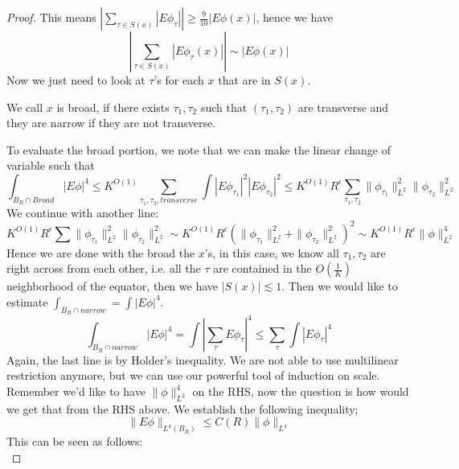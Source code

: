 \begin{proof}
    This means $\left|\sum_{\tau\in S(x)}|E\phi_\tau| \right|\geq\frac{9}{10}|E\phi(x)|$, hence we have
    \begin{equation*}
        \left|\sum_{\tau\in S(x)}|E\phi_\tau(x)| \right|\sim|E\phi(x)|
    \end{equation*}
Now we just need to look at $\tau$'s for each $x$ that are in $S(x)$. 
\begin{definition}
    We call $x$ is broad, if there exists $\tau_1, \tau_2$ such that $(\tau_1, \tau_2)$ are transverse and they are narrow if they are not transverse.    
\end{definition}
    To evaluate the broad portion, we note that we can make the linear change of variable such that 
    \begin{equation*}
        \int_{{B_R}\cap Broad}|E\phi|^4\leq K^{O(1)}\sum_{\tau_1, \tau_2, transverse}\int|E\phi_{\tau_1}|^2|E\phi_{\tau_2}|^2\leq K^{O(1)}R^\epsilon\sum_{\tau_1,\tau_2}\|\phi_{\tau_1}\|_{L^2}^2\|\phi_{\tau_2}\|_{L^2}^2
    \end{equation*}
    We continue with another line:
    \begin{equation*}
        K^{O(1)}R^\epsilon\sum\|\phi_{\tau_1}\|_{L^2}^2\|\phi_{\tau_2}\|_{L^2}^2\sim K^{O(1)}R^\epsilon\left(\|\phi_{\tau_1}\|_{L^2}^2+\|\phi_{\tau_2}\|_{L^2}^2 \right)^2\sim K^{O(1)}R^\epsilon\|\phi\|_{L^2}^4
    \end{equation*}
    Hence we are done with the broad the $x$'s, in this case, we know all $\tau_1, \tau_2$ are right across from each other, i.e. all the $\tau$ are contained in the $O(\frac{1}{K})$ neighborhood of the equator, then we have $|S(x)|\lesssim 1$.
    Then we would like to estimate $\int_{B_R\cap narrow}=\int|E\phi|^4$.
    \begin{equation*}
        \int_{B_R\cap narrow}|E\phi|^4=\int|\sum_\tau E\phi_\tau|^4\leq\sum_\tau\int|E\phi_\tau|^4
    \end{equation*}
    Again, the last line is by Holder's inequality. We are not able to use multilinear restriction anymore, but we can use our powerful tool of induction on scale. Remember we'd like to have $\|\phi\|_{L^2}^4$ on the RHS, now the question is how would we get that from the RHS above. We establish the following inequality;
    \begin{equation*}
        \|E\phi\|_{L^4(B_R)}\leq C(R)\|\phi\|_{L^4}
    \end{equation*}
    This can be seen as follows:
    \begin{equation*}

\end{equation*}
\end{proof}
